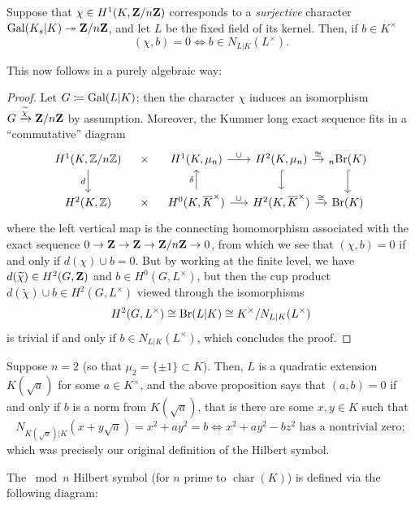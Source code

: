 \documentclass{article}
\begin{document}
\begin{prop}
		Suppose that $\chi\in H^1(K,\mathbf{Z} /n\mathbf{Z})$ corresponds to a \emph{surjective} character $\operatorname{Gal}(K_s|K)\twoheadrightarrow \mathbf{Z}/n\mathbf{Z}$, and let $L$ be the fixed field of its kernel. Then, if $b\in K^\times$ 
		\[
			(\chi,b)=0\iff b\in N_{L|K}(L^\times).
		\]
\end{prop}
This now follows in a purely algebraic way:
\begin{proof}
		Let $G\coloneqq \operatorname{Gal}(L|K)$; then the character $\chi$ induces an isomorphism $G\xrightarrow{\widetilde{\chi}} \mathbf{Z}/n\mathbf{Z}$ by assumption. Moreover, the Kummer long exact sequence fits in a ``commutative'' diagram
		\[
\begin{tikzcd}[column sep=0.8em]
H^1(K,\mathbb{Z}/n\mathbb{Z})
  \arrow[d, "d"']
&
\times
&
H^1(K,\mu_n)
	\arrow[rr, "\cup"]
&
&
H^2(K,\mu_n)
  \arrow[r, "\cong"]
	\arrow[d, hook]
&
{}_n\Br(K)
  \arrow[d, hook]
\\
H^2(K,\mathbb{Z})
&
\times
&
H^0(K,\overline{K}^{\times})
  \arrow[u, "\delta"]
	\arrow[rr, "\cup"]
&
&
H^2(K,\overline{K}^{\times})
  \arrow[r, "\cong"]
&
\Br(K)
\end{tikzcd}
\]
where the left vertical map is the connecting homomorphism associated with the exact sequence $0\to \mathbf{Z} \to \mathbf{Z} \to \mathbf{Z}/n\mathbf{Z}\to 0$, from which we see that $(\chi,b)=0$ if and only if $d(\chi)\cup b=0$. But by working at the finite level, we have $d(\widetilde{\chi})\in H^2(G,\mathbf{Z})$ and $b\in H^0(G,L^\times)$, but then the cup product $d(\widetilde{\chi})\cup b\in H^2(G,L^\times)$ viewed through the isomorphisms $$H^2(G,L^\times)\cong \text{Br}(L|K)\cong K^\times / N_{L|K}(L^\times)$$ is trivial if and only if $b\in N_{L|K}(L^\times)$, which concludes the proof.
\end{proof}

Suppose $n=2$ (so that $\mu_2=\{\pm 1\}\subset K$). Then, $L$ is a quadratic extension $K(\sqrt{a})$ for some $a\in K^\times$, and the above proposition says that $(a,b)=0$ if and only if $b$ is a norm from $K(\sqrt{a})$, that is there are some $x,y\in K$ such that 
\[
	N_{K(\sqrt{a})|K}(x+y\sqrt{a})=x^2+ay^2=b \iff x^2 +ay^2-bz^2\text{ has a nontrivial zero};
\]
which was precisely our original definition of the Hilbert symbol.

The $\bmod n$ Hilbert symbol (for $n$ prime to $\operatorname{char}(K)$) is defined via the following diagram:
\end{document}
